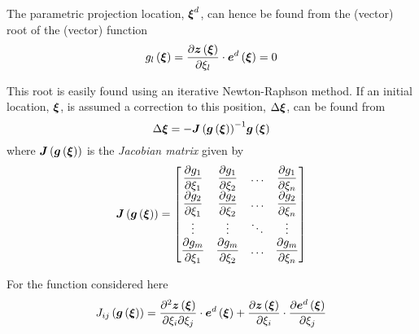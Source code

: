 The parametric projection location, $\boldsymbol{\xi}^{d}$, can hence be found
from the (vector) root of the (vector) function
\begin{equation}
  \fnof{g_{l}}{\vect{\xi}}=\dotprod{\delby{\fnof{\vect{z}}{\vectr{\xi}}}{
      \xi_{l}}}{\fnof{\vectr{e}^{d}}{\vectr{\xi}}}=0
\end{equation}

This root is easily found using an iterative Newton-Raphson method. If an
initial location, $\boldsymbol{\xi}$, is assumed a correction to this position,
$\Delta\boldsymbol{\xi}$, can be found from 
\begin{equation}
  \Delta\vectr{\xi}=-\inverse{\fnof{\matr{J}}{\fnof{\vectr{g}}{\vectr{\xi}}}}
  \fnof{\vectr{g}}{\vectr{\xi}}
\end{equation}
where $\fnof{\matr{J}}{\fnof{\vectr{g}}{\vectr{\xi}}}$ is the \emph{Jacobian
  matrix} given by
\begin{equation}
  \fnof{\matr{J}}{\fnof{\vectr{g}}{\vect{\xi}}}=\begin{bmatrix}
    \delby{g_{1}}{\xi_{1}} & \delby{g_{1}}{\xi_{2}} & \ldots & 
    \delby{g_{1}}{\xi_{n}} \\
    \delby{g_{2}}{\xi_{1}} & \delby{g_{2}}{\xi_{2}} & \ldots & 
    \delby{g_{2}}{\xi_{n}} \\
    \vdots & \vdots & \ddots & \vdots \\
    \delby{g_{m}}{\xi_{1}} & \delby{g_{m}}{\xi_{2}} & \ldots & 
    \delby{g_{m}}{\xi_{n}}
  \end{bmatrix}
\end{equation}

For the function considered here
\begin{equation}
  \fnof{J_{ij}}{\fnof{\vectr{g}}{\vectr{\xi}}}=\dotprod{\deltwoby{\fnof{
        \vectr{z}}{\vectr{\xi}}}{\xi_{i}}{\xi_{j}}}{\fnof{\vect{e}^{d}}{
      \vectr{\xi}}}+\dotprod{\delby{\fnof{\vectr{z}}{\vectr{\xi}}}{\xi_{i}}}{
    \delby{\fnof{\vectr{e}^{d}}{\vectr{\xi}}}{\xi_{j}}}
\end{equation}

